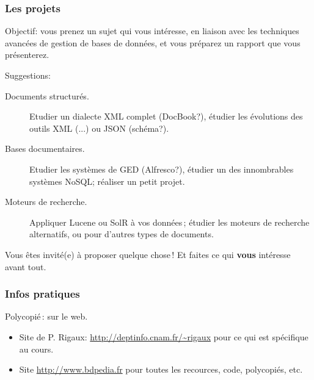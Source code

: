 \begin{frame}
\frametitle{Les projets}

Objectif: vous prenez un sujet qui vous intéresse, en liaison avec les
techniques avancées de gestion de bases de données, et vous préparez un
rapport que vous présenterez. 

\vfill

Suggestions:
\begin{description}

  \item [Documents structurés.] Etudier un dialecte XML complet (DocBook?), étudier les évolutions des outils XML (...) ou JSON (schéma?).

  \item [Bases documentaires.] Etudier les systèmes de GED (Alfresco?), étudier un des innombrables systèmes NoSQL; réaliser un petit projet.
  
  \item [Moteurs de recherche.] Appliquer Lucene ou SolR à \alert{vos} données\,; étudier les moteurs de recherche alternatifs, ou pour d'autres
      types de documents.
\end{description}

\vfill

Vous êtes invité(e) à proposer quelque chose\,! \alert{Et faites ce qui \textbf{vous} intéresse avant tout.}

\end{frame}


\begin{frame}
\frametitle{Infos pratiques}

Polycopié\,: sur le web.

\begin{itemize}
 \item Site de P. Rigaux: \url{http://deptinfo.cnam.fr/\~rigaux} pour ce qui est spécifique au cours.
  \item Site \url{http://www.bdpedia.fr} pour toutes les recources, code, polycopiés, etc.
\end{itemize}

\end{frame}

